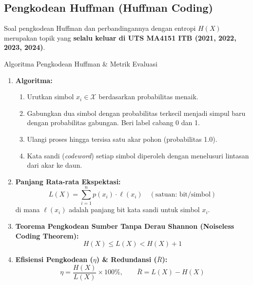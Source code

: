 \documentclass[11pt,a4paper]{article}
\begin{document}
\subsection{Pengkodean Huffman (Huffman Coding)}
Soal pengkodean Huffman dan perbandingannya dengan entropi $H(X)$ merupakan topik yang \textbf{selalu keluar di UTS MA4151 ITB (2021, 2022, 2023, 2024)}.
\begin{rumusbox}{Algoritma Pengkodean Huffman \& Metrik Evaluasi}
\begin{enumerate}[leftmargin=*]
    \item \textbf{Algoritma:}
    \begin{enumerate}
        \item Urutkan simbol $x_i \in \mathcal{X}$ berdasarkan probabilitas menaik.
        \item Gabungkan dua simbol dengan probabilitas terkecil menjadi simpul baru dengan probabilitas gabungan. Beri label cabang 0 dan 1.
        \item Ulangi proses hingga tersisa satu akar pohon (probabilitas 1.0).
        \item Kata sandi (\textit{codeword}) setiap simbol diperoleh dengan menelusuri lintasan dari akar ke daun.
    \end{enumerate}
    \item \textbf{Panjang Rata-rata Ekspektasi:}
    \[
    L(X) = \sum_{i=1}^n p(x_i) \cdot \ell(x_i) \quad (\text{satuan: bit/simbol})
    \]
    di mana $\ell(x_i)$ adalah panjang bit kata sandi untuk simbol $x_i$.
    \item \textbf{Teorema Pengkodean Sumber Tanpa Derau Shannon (Noiseless Coding Theorem):}
    \[
    H(X) \le L(X) < H(X) + 1
    \]
    \item \textbf{Efisiensi Pengkodean ($\eta$) \& Redundansi ($\bar{R}$):}
    \[
    \eta = \frac{H(X)}{L(X)} \times 100\%, \qquad \bar{R} = L(X) - H(X)
    \]
\end{enumerate}
\end{rumusbox}
\end{document}
